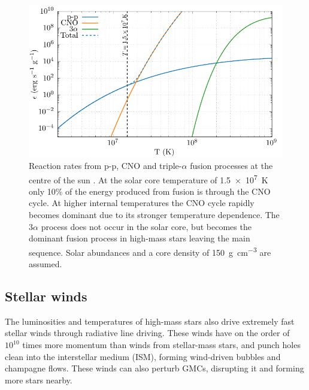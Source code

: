 \begin{figure}[h]
  \centering
  \includegraphics{assets/reaction-rate/reaction-solar.pdf}
  \caption[Reaction rates at the center of the sun]{Reaction rates from p-p, CNO and triple-$\alpha$ fusion processes at the centre of the sun \parencite{harrisThermonuclearReactionRates1983}. At the solar core temperature of \SI{1.5e7}{\kelvin} only 10\% of the energy produced from fusion is through the CNO cycle. At higher internal temperatures the CNO cycle rapidly becomes dominant due to its stronger temperature dependence. The $3\alpha$ process does not occur in the solar core, but becomes the dominant fusion process in high-mass stars leaving the main sequence. Solar abundances and a core density of \SI{150}{\gram\per\centi\metre\cubed} are assumed.}
  \label{fig:fusionrates}
\end{figure}

\subsection{Stellar winds}

The luminosities and temperatures of high-mass stars also drive extremely fast stellar winds through radiative line driving.
These winds have on the order of $10^{10}$ times more momentum than winds from stellar-mass stars, and punch holes clean into the interstellar medium (ISM), forming wind-driven bubbles and champagne flows.
These winds can also perturb GMCs, disrupting it and forming more stars nearby.

